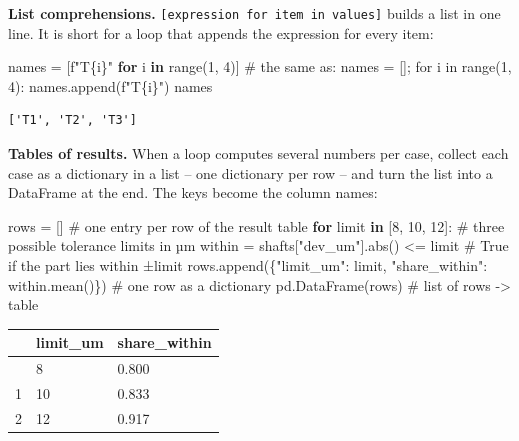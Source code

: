 \documentclass[
  letterpaper,
  DIV=11,
  numbers=noendperiod]{scrreprt}
\newenvironment{Shaded}{\begin{snugshade}}{\end{snugshade}}
\newcommand{\BuiltInTok}[1]{\textcolor[rgb]{0.00,0.23,0.31}{#1}}
\newcommand{\CommentTok}[1]{\textcolor[rgb]{0.37,0.37,0.37}{#1}}
\newcommand{\ControlFlowTok}[1]{\textcolor[rgb]{0.00,0.23,0.31}{\textbf{#1}}}
\newcommand{\DecValTok}[1]{\textcolor[rgb]{0.68,0.00,0.00}{#1}}
\newcommand{\KeywordTok}[1]{\textcolor[rgb]{0.00,0.23,0.31}{\textbf{#1}}}
\newcommand{\NormalTok}[1]{\textcolor[rgb]{0.00,0.23,0.31}{#1}}
\newcommand{\OperatorTok}[1]{\textcolor[rgb]{0.37,0.37,0.37}{#1}}
\newcommand{\SpecialCharTok}[1]{\textcolor[rgb]{0.37,0.37,0.37}{#1}}
\newcommand{\SpecialStringTok}[1]{\textcolor[rgb]{0.13,0.47,0.30}{#1}}
\newcommand{\StringTok}[1]{\textcolor[rgb]{0.13,0.47,0.30}{#1}}
\begin{document}
\textbf{List comprehensions.}
\texttt{{[}expression\ for\ item\ in\ values{]}} builds a list in one
line. It is short for a loop that appends the expression for every item:

\begin{Shaded}
\begin{Highlighting}[]
\NormalTok{names }\OperatorTok{=}\NormalTok{ [}\SpecialStringTok{f"T}\SpecialCharTok{\{}\NormalTok{i}\SpecialCharTok{\}}\SpecialStringTok{"} \ControlFlowTok{for}\NormalTok{ i }\KeywordTok{in} \BuiltInTok{range}\NormalTok{(}\DecValTok{1}\NormalTok{, }\DecValTok{4}\NormalTok{)]     }\CommentTok{\# the same as: names = []; for i in range(1, 4): names.append(f"T\{i\}")}
\NormalTok{names}
\end{Highlighting}
\end{Shaded}

\begin{verbatim}
['T1', 'T2', 'T3']
\end{verbatim}

\textbf{Tables of results.} When a loop computes several numbers per
case, collect each case as a dictionary in a list -- one dictionary per
row -- and turn the list into a DataFrame at the end. The keys become
the column names:

\begin{Shaded}
\begin{Highlighting}[]
\NormalTok{rows }\OperatorTok{=}\NormalTok{ []                                                  }\CommentTok{\# one entry per row of the result table}
\ControlFlowTok{for}\NormalTok{ limit }\KeywordTok{in}\NormalTok{ [}\DecValTok{8}\NormalTok{, }\DecValTok{10}\NormalTok{, }\DecValTok{12}\NormalTok{]:                                  }\CommentTok{\# three possible tolerance limits in µm}
\NormalTok{    within }\OperatorTok{=}\NormalTok{ shafts[}\StringTok{"dev\_um"}\NormalTok{].}\BuiltInTok{abs}\NormalTok{() }\OperatorTok{\textless{}=}\NormalTok{ limit               }\CommentTok{\# True if the part lies within ±limit}
\NormalTok{    rows.append(\{}\StringTok{"limit\_um"}\NormalTok{: limit, }\StringTok{"share\_within"}\NormalTok{: within.mean()\})   }\CommentTok{\# one row as a dictionary}
\NormalTok{pd.DataFrame(rows)                                         }\CommentTok{\# list of rows {-}\textgreater{} table}
\end{Highlighting}
\end{Shaded}

\begin{longtable}[]{@{}lll@{}}
\toprule\noalign{}
& limit\_um & share\_within \\
\midrule\noalign{}
\endhead
\bottomrule\noalign{}
\endlastfoot
0 & 8 & 0.800 \\
1 & 10 & 0.833 \\
2 & 12 & 0.917 \\
\end{longtable}
\end{document}

